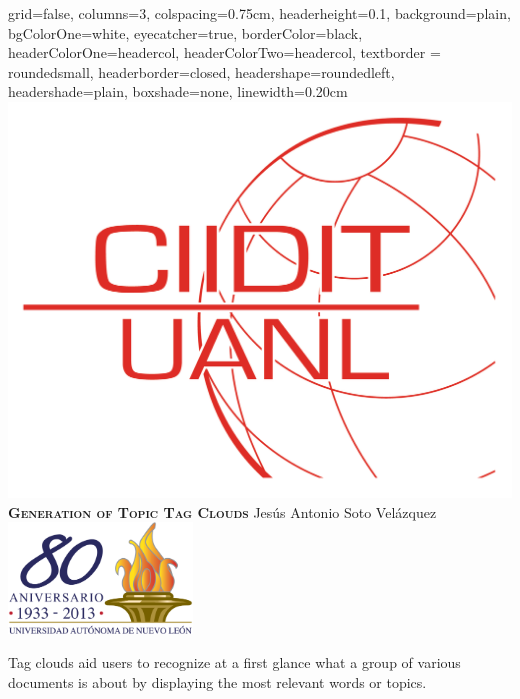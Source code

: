 \documentclass[a0paper, portrait]{baposter}
\begin{document}
\begin{poster}{
    grid=false,
    columns=3,
    colspacing=0.75cm, %
    headerheight=0.1\textheight,
    background=plain,
    bgColorOne=white,
    eyecatcher=true,
    borderColor=black,
    headerColorOne=headercol,
    headerColorTwo=headercol,
    textborder = roundedsmall,
    headerborder=closed,
    headershape=roundedleft,
    headershade=plain,
    boxshade=none,
    linewidth=0.20cm
}
  { \includegraphics[height=0.1\textheight]{ciidit.png} }
  {\bf\textsc{Generation of Topic Tag Clouds}} 
  {
    Jes\'us Antonio Soto Vel\'azquez 
  }
  {
    \includegraphics[height=8.0em]{uanl.png}
  }


   {
    Tag clouds aid users to recognize at a first glance what a group of various documents is about by displaying the most relevant words or topics.
    \newline

}
\end{poster}
\end{document}
